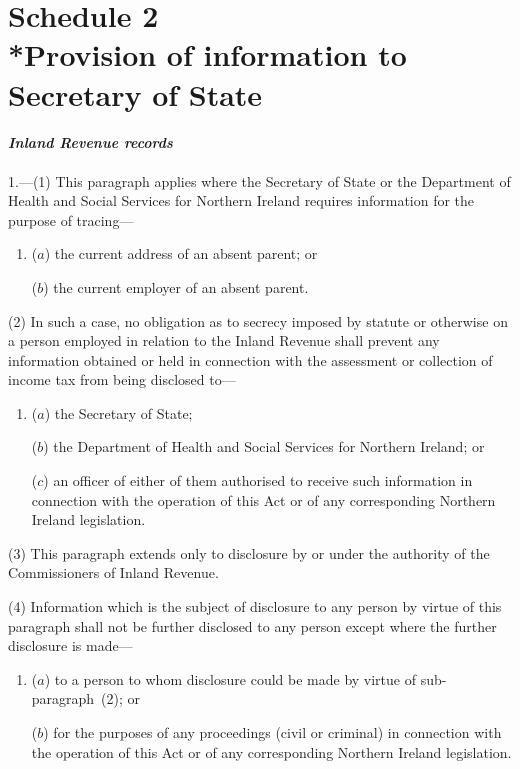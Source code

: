 \documentclass[12pt,a4paper]{article}
\begin{document}

\part[Schedule 2 --- Provision of information to Secretary of State]{Schedule 2\\*Provision of information to Secretary of State}

\renewcommand\parthead{--- Schedule 2}

\subsection*{\itshape Inland Revenue records}

1.---(1) This paragraph applies where the Secretary of State or the Department of Health and Social Services for Northern Ireland requires information for the purpose of tracing—
\begin{enumerate}\item[]
($a$) the current address of an absent parent; or

($b$) the current employer of an absent parent.
\end{enumerate}

(2) In such a case, no obligation as to secrecy imposed by statute or otherwise on a person employed in relation to the Inland Revenue shall prevent any information obtained or held in connection with the assessment or collection of income tax from being disclosed to—
\begin{enumerate}\item[]
($a$) the Secretary of State;

($b$) the Department of Health and Social Services for Northern Ireland; or

($c$) an officer of either of them authorised to receive such information in connection with the operation of this Act or of any corresponding Northern Ireland legislation.
\end{enumerate}

(3) This paragraph extends only to disclosure by or under the authority of the Commissioners of Inland Revenue.

(4) Information which is the subject of disclosure to any person by virtue of this paragraph shall not be further disclosed to any person except where the further disclosure is made—
\begin{enumerate}\item[]
($a$) to a person to whom disclosure could be made by virtue of sub-\hspace{0pt}paragraph~(2); or

($b$) for the purposes of any proceedings (civil or criminal) in connection with the operation of this Act or of any corresponding Northern Ireland legislation.
\end{enumerate}
\end{document}
